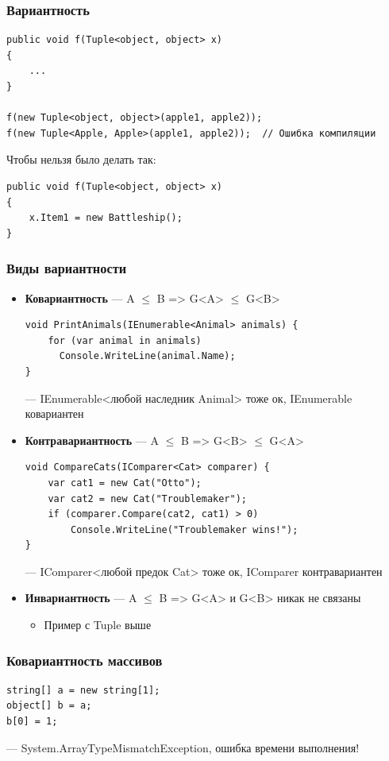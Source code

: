 \documentclass[xetex,mathserif,serif]{beamer}
\begin{document}
	\begin{frame}[fragile]
		\frametitle{Вариантность}
		\begin{verbatim}
public void f(Tuple<object, object> x)
{
    ...
}

f(new Tuple<object, object>(apple1, apple2));
f(new Tuple<Apple, Apple>(apple1, apple2));  // Ошибка компиляции
		\end{verbatim}
		\vspace{3mm}
		Чтобы нельзя было делать так:
		\begin{verbatim}
public void f(Tuple<object, object> x)
{
    x.Item1 = new Battleship();
}
		\end{verbatim}
	\end{frame}

		\begin{frame}[fragile]
		\frametitle{Виды вариантности}
		\begin{footnotesize}
			\begin{itemize}
				\item \textbf{Ковариантность} --- A $\leq$ B => G<A> $\leq$ G<B>
				\begin{verbatim}
void PrintAnimals(IEnumerable<Animal> animals) {
    for (var animal in animals)
      Console.WriteLine(animal.Name);
}
				\end{verbatim}
				--- IEnumerable<любой наследник Animal> тоже ок, IEnumerable ковариантен
				\item \textbf{Контравариантность} --- A $\leq$ B => G<B> $\leq$ G<A>
				\begin{verbatim}
void CompareCats(IComparer<Cat> comparer) {
    var cat1 = new Cat("Otto");
    var cat2 = new Cat("Troublemaker");
    if (comparer.Compare(cat2, cat1) > 0) 
        Console.WriteLine("Troublemaker wins!");
}
				\end{verbatim}
				--- IComparer<любой предок Cat> тоже ок, IComparer контравариантен
				\item \textbf{Инвариантность} --- A $\leq$ B => G<A> и G<B> никак не связаны
				\begin{itemize}
					\item Пример с Tuple выше
				\end{itemize}
			\end{itemize}
		\end{footnotesize}
	\end{frame}

	\begin{frame}[fragile]
		\frametitle{Ковариантность массивов}
		\begin{verbatim}
string[] a = new string[1];
object[] b = a;
b[0] = 1;
		\end{verbatim}
		--- System.ArrayTypeMismatchException, ошибка времени выполнения!
	\end{frame}
\end{document}
